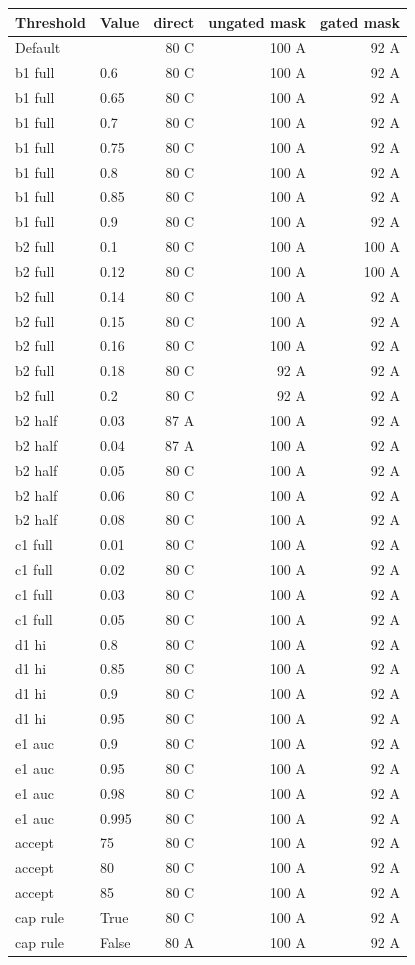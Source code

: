 \begin{tabular}{llrrr}
\hline
Threshold & Value & direct & ungated mask & gated mask \\
\hline
Default & & 80 C & 100 A & 92 A \\
b1 full & 0.6 & 80 C & 100 A & 92 A \\
b1 full & 0.65 & 80 C & 100 A & 92 A \\
b1 full & 0.7 & 80 C & 100 A & 92 A \\
b1 full & 0.75 & 80 C & 100 A & 92 A \\
b1 full & 0.8 & 80 C & 100 A & 92 A \\
b1 full & 0.85 & 80 C & 100 A & 92 A \\
b1 full & 0.9 & 80 C & 100 A & 92 A \\
b2 full & 0.1 & 80 C & 100 A & 100 A \\
b2 full & 0.12 & 80 C & 100 A & 100 A \\
b2 full & 0.14 & 80 C & 100 A & 92 A \\
b2 full & 0.15 & 80 C & 100 A & 92 A \\
b2 full & 0.16 & 80 C & 100 A & 92 A \\
b2 full & 0.18 & 80 C & 92 A & 92 A \\
b2 full & 0.2 & 80 C & 92 A & 92 A \\
b2 half & 0.03 & 87 A & 100 A & 92 A \\
b2 half & 0.04 & 87 A & 100 A & 92 A \\
b2 half & 0.05 & 80 C & 100 A & 92 A \\
b2 half & 0.06 & 80 C & 100 A & 92 A \\
b2 half & 0.08 & 80 C & 100 A & 92 A \\
c1 full & 0.01 & 80 C & 100 A & 92 A \\
c1 full & 0.02 & 80 C & 100 A & 92 A \\
c1 full & 0.03 & 80 C & 100 A & 92 A \\
c1 full & 0.05 & 80 C & 100 A & 92 A \\
d1 hi & 0.8 & 80 C & 100 A & 92 A \\
d1 hi & 0.85 & 80 C & 100 A & 92 A \\
d1 hi & 0.9 & 80 C & 100 A & 92 A \\
d1 hi & 0.95 & 80 C & 100 A & 92 A \\
e1 auc & 0.9 & 80 C & 100 A & 92 A \\
e1 auc & 0.95 & 80 C & 100 A & 92 A \\
e1 auc & 0.98 & 80 C & 100 A & 92 A \\
e1 auc & 0.995 & 80 C & 100 A & 92 A \\
accept & 75 & 80 C & 100 A & 92 A \\
accept & 80 & 80 C & 100 A & 92 A \\
accept & 85 & 80 C & 100 A & 92 A \\
cap rule & True & 80 C & 100 A & 92 A \\
cap rule & False & 80 A & 100 A & 92 A \\
\hline
\end{tabular}